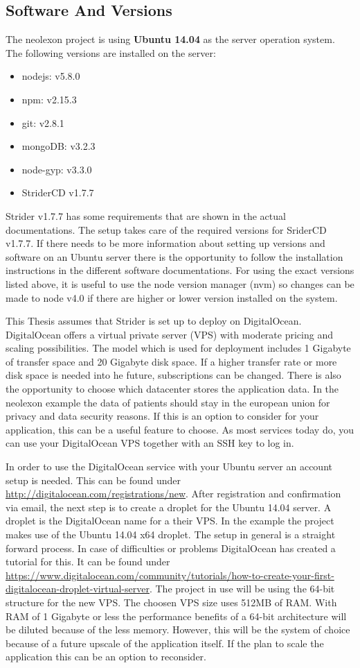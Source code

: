 \subsection{Software And Versions}
The neolexon project is using \textbf{Ubuntu 14.04} as the server operation system. The following versions are installed on the server:
\begin{itemize}
  \item nodejs: v5.8.0
  \item npm: v2.15.3
  \item git: v2.8.1
  \item mongoDB: v3.2.3
  \item node-gyp: v3.3.0
  \item StriderCD v1.7.7
\end{itemize}

Strider v1.7.7 has some requirements that are shown in the actual documentations. The setup takes care of the required versions for SriderCD v1.7.7.
If there needs to be more information about setting up versions and software on an Ubuntu server there is the opportunity to follow the installation instructions
in the different software documentations. For using the exact versions listed above, it is useful to use the node version manager (nvm) so changes can be
made to node v4.0 if there are higher or lower version installed on the system.

This Thesis assumes that Strider is set up to deploy on DigitalOcean. DigitalOcean offers a virtual private server (VPS) with moderate pricing and scaling
possibilities. The model which is used for deployment includes 1 Gigabyte of transfer space and 20 Gigabyte disk space. If a higher transfer rate or more disk space
is needed into he future, subscriptions can be changed. There is also the opportunity to choose which datacenter stores the application data. In the neolexon example
the data of patients should stay in the european union for privacy and data security reasons. If this is an option to consider for your application, this can be a useful
feature to choose. As most services today do, you can use your DigitalOcean VPS together with an SSH key to log in.

In order to use the DigitalOcean service with your Ubuntu server an account setup is needed. This can be found under \url{http://digitalocean.com/registrations/new}. After
registration and confirmation via email, the next step is to create a droplet for the Ubuntu 14.04 server. A droplet is the DigitalOcean name for a their VPS.
In the example the project makes use of the Ubuntu 14.04 x64 droplet. The setup in general is a straight forward process. In case of difficulties or problems DigitalOcean has
created a tutorial for this. It can be found under \url{https://www.digitalocean.com/community/tutorials/how-to-create-your-first-digitalocean-droplet-virtual-server}.
The project in use will be using the 64-bit structure for the new VPS. The choosen VPS size uses 512MB of RAM. With RAM of 1 Gigabyte or less the performance benefits of a 64-bit
architecture will be diluted because of the less memory. However, this will be the system of choice because of a future upscale of the application itself. If the plan
to scale the application this can be an option to reconsider.

